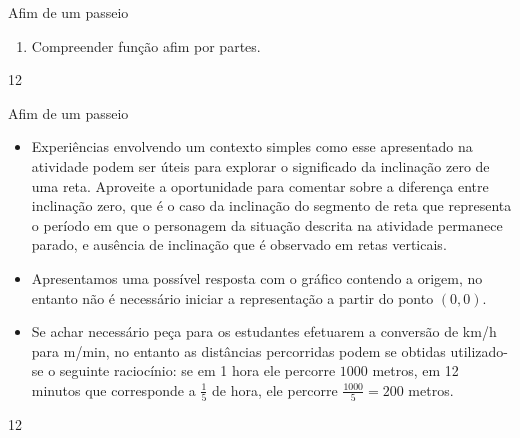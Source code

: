 \clearpage
\def\currentcolor{session3}
\begin{objectives}{Afim de um passeio}
{
\begin{enumerate}
\item Compreender função afim por partes.
\end{enumerate}
}{1}{2}
\end{objectives}
\marginpar{\vspace{-2em}}
\begin{sugestions}{Afim de um passeio}
{
\begin{itemize}
\item Experiências envolvendo um contexto simples como esse apresentado na atividade podem ser úteis para explorar o significado da inclinação zero de uma reta. Aproveite a oportunidade para comentar sobre a diferença entre inclinação zero, que é o caso da inclinação do segmento de reta que representa o período em que o personagem da situação descrita na atividade permanece parado, e ausência de inclinação que é observado em retas verticais.
\item Apresentamos uma possível resposta com o gráfico contendo a origem, no entanto não é necessário iniciar a representação a partir do ponto $(0,0)$.
\item Se achar necessário peça para os estudantes efetuarem a conversão de km/h para m/min, no entanto as distâncias percorridas podem se obtidas utilizado-se o seguinte raciocínio: se em 1 hora ele percorre $1000$ metros, em 12 minutos que corresponde a $\displaystyle\frac{1}{5}$ de hora, ele percorre $\displaystyle\frac{1000}{5}=200$ metros.
\end{itemize}
}{1}{2}
\end{sugestions}
\marginpar{\vspace{-1em}}
